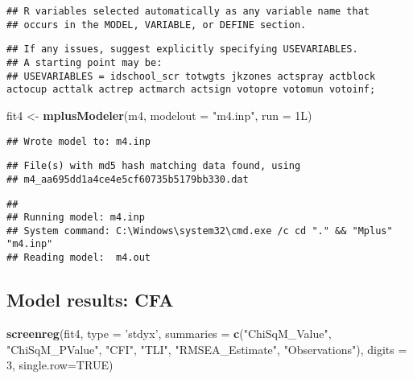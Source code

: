 \documentclass[
]{article}
\newenvironment{Shaded}{\begin{snugshade}}{\end{snugshade}}
\newcommand{\DataTypeTok}[1]{\textcolor[rgb]{0.13,0.29,0.53}{#1}}
\newcommand{\DecValTok}[1]{\textcolor[rgb]{0.00,0.00,0.81}{#1}}
\newcommand{\KeywordTok}[1]{\textcolor[rgb]{0.13,0.29,0.53}{\textbf{#1}}}
\newcommand{\NormalTok}[1]{#1}
\newcommand{\OtherTok}[1]{\textcolor[rgb]{0.56,0.35,0.01}{#1}}
\newcommand{\StringTok}[1]{\textcolor[rgb]{0.31,0.60,0.02}{#1}}
\begin{document}
\begin{verbatim}
## R variables selected automatically as any variable name that
## occurs in the MODEL, VARIABLE, or DEFINE section.
\end{verbatim}

\begin{verbatim}
## If any issues, suggest explicitly specifying USEVARIABLES.
## A starting point may be:
## USEVARIABLES = idschool_scr totwgts jkzones actspray actblock actocup acttalk actrep actmarch actsign votopre votomun votoinf;
\end{verbatim}

\begin{Shaded}
\begin{Highlighting}[]
\NormalTok{fit4 <-}\StringTok{ }\KeywordTok{mplusModeler}\NormalTok{(m4, }\DataTypeTok{modelout =} \StringTok{"m4.inp"}\NormalTok{, }\DataTypeTok{run =}\NormalTok{ 1L)}
\end{Highlighting}
\end{Shaded}

\begin{verbatim}
## Wrote model to: m4.inp
\end{verbatim}

\begin{verbatim}
## File(s) with md5 hash matching data found, using 
## m4_aa695dd1a4ce4e5cf60735b5179bb330.dat
\end{verbatim}

\begin{verbatim}
## 
## Running model: m4.inp 
## System command: C:\Windows\system32\cmd.exe /c cd "." && "Mplus" "m4.inp" 
## Reading model:  m4.out
\end{verbatim}

\hypertarget{model-results-cfa}{%
\subsection{Model results: CFA}\label{model-results-cfa}}

\begin{Shaded}
\begin{Highlighting}[]
\KeywordTok{screenreg}\NormalTok{(fit4, }\DataTypeTok{type =} \StringTok{'stdyx'}\NormalTok{, }\DataTypeTok{summaries =} \KeywordTok{c}\NormalTok{(}\StringTok{"ChiSqM_Value"}\NormalTok{, }\StringTok{"ChiSqM_PValue"}\NormalTok{, }\StringTok{"CFI"}\NormalTok{, }\StringTok{"TLI"}\NormalTok{, }\StringTok{"RMSEA_Estimate"}\NormalTok{, }\StringTok{"Observations"}\NormalTok{), }\DataTypeTok{digits =} \DecValTok{3}\NormalTok{, }\DataTypeTok{single.row=}\OtherTok{TRUE}\NormalTok{)}
\end{Highlighting}
\end{Shaded}
\end{document}
